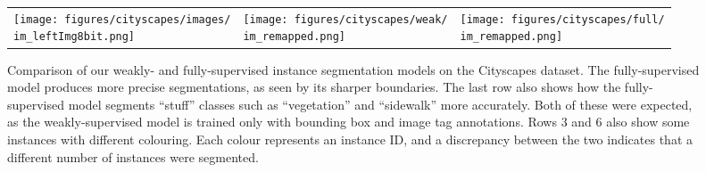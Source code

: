 \documentclass[runningheads]{llncs}
\begin{document}
\begin{figure}[t]
\begin{tabularx}{\linewidth}{ Y Y Y}
	
\global \def \im{lindau_000026_000019}
	\texttt{[image: figures/cityscapes/images/\\im\_leftImg8bit.png]} &
	\texttt{[image: figures/cityscapes/weak/\\im\_remapped.png]} &
	\texttt{[image: figures/cityscapes/full/\\im\_remapped.png]} \\
	
	
	\end{tabularx}
	\caption{Comparison of our weakly- and fully-supervised instance segmentation models on the Cityscapes dataset. The fully-supervised model produces more precise segmentations, as seen by its sharper boundaries. The last row also shows how the fully-supervised model segments ``stuff'' classes such as ``vegetation'' and ``sidewalk'' more accurately.
	Both of these were expected, as the weakly-supervised model is trained only with bounding box and image tag annotations.
	Rows 3 and 6 also show some instances with different colouring.
	Each colour represents an instance ID, and a discrepancy between the two indicates that a different number of instances were segmented.}
	\label{fig:cityscapes_qualitative}
\end{figure}
\end{document}
